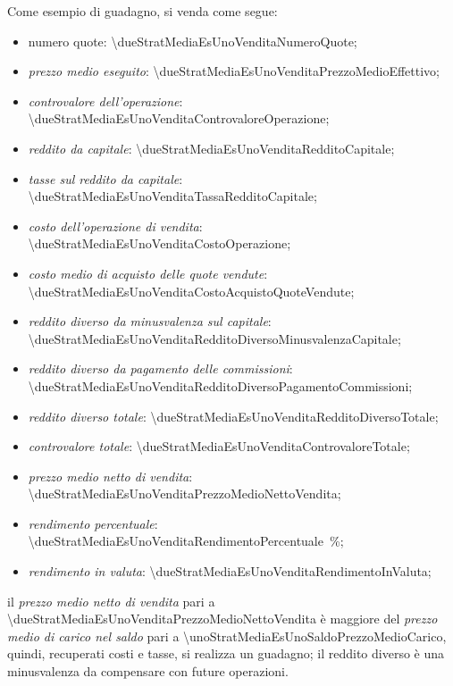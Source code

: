 \documentclass[12pt,a4paper]{article}
\newcommand{\Eur}[1]{\SI{#1}{\text{\euro{}}}}
\begin{document}
Come esempio di guadagno, si venda come segue:
\begin{itemize}
\item numero quote: \num{\dueStratMediaEsUnoVenditaNumeroQuote};
\item \emph{prezzo medio eseguito}: \Eur{\dueStratMediaEsUnoVenditaPrezzoMedioEffettivo};
\item \emph{controvalore dell'operazione}: \Eur{\dueStratMediaEsUnoVenditaControvaloreOperazione};

\item \emph{reddito da capitale}: \Eur{\dueStratMediaEsUnoVenditaRedditoCapitale};
\item \emph{tasse sul reddito da capitale}: \Eur{\dueStratMediaEsUnoVenditaTassaRedditoCapitale};

\item \emph{costo dell'operazione di vendita}: \Eur{\dueStratMediaEsUnoVenditaCostoOperazione};
\item \emph{costo medio di acquisto delle quote vendute}: \Eur{\dueStratMediaEsUnoVenditaCostoAcquistoQuoteVendute};
\item \emph{reddito diverso da minusvalenza sul capitale}: \Eur{\dueStratMediaEsUnoVenditaRedditoDiversoMinusvalenzaCapitale};
\item \emph{reddito diverso da pagamento delle commissioni}: \Eur{\dueStratMediaEsUnoVenditaRedditoDiversoPagamentoCommissioni};
\item \emph{reddito diverso totale}: \Eur{\dueStratMediaEsUnoVenditaRedditoDiversoTotale};

\item \emph{controvalore totale}: \Eur{\dueStratMediaEsUnoVenditaControvaloreTotale};

\item \emph{prezzo medio netto di vendita}: \Eur{\dueStratMediaEsUnoVenditaPrezzoMedioNettoVendita};
\item \emph{rendimento percentuale}: \SI{\dueStratMediaEsUnoVenditaRendimentoPercentuale}{\percent};
\item \emph{rendimento in valuta}: \Eur{\dueStratMediaEsUnoVenditaRendimentoInValuta};
\end{itemize}
il         \emph{prezzo        medio         netto         di         vendita}        pari         a
\Eur{\dueStratMediaEsUnoVenditaPrezzoMedioNettoVendita} è maggiore del  \emph{prezzo medio di carico
   nel  saldo} pari  a \Eur{\unoStratMediaEsUnoSaldoPrezzoMedioCarico},  quindi, recuperati  costi e
tasse, si  realizza un  guadagno; il  reddito diverso è  una minusvalenza  da compensare  con future
operazioni.
\end{document}
